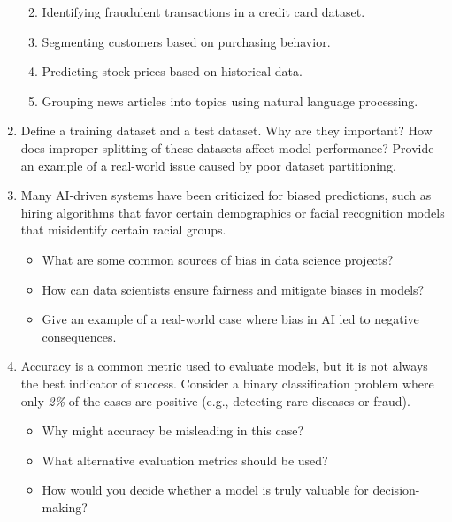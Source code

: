 \documentclass[
]{book}
\providecommand{\tightlist}{%
  \setlength{\itemsep}{0pt}\setlength{\parskip}{0pt}}
\theoremstyle{definition}
\theoremstyle{definition}
\theoremstyle{definition}
\theoremstyle{definition}
\theoremstyle{remark}
\begin{document}
\begin{enumerate}
  \begin{enumerate}
  \def\labelenumii{\alph{enumii}.}
  \tightlist
  \item
    Identifying fraudulent transactions in a credit card dataset.\\
  \item
    Segmenting customers based on purchasing behavior.\\
  \item
    Predicting stock prices based on historical data.\\
  \item
    Grouping news articles into topics using natural language processing.\\
  \end{enumerate}
\item
  Define a training dataset and a test dataset. Why are they important? How does improper splitting of these datasets affect model performance? Provide an example of a real-world issue caused by poor dataset partitioning.\\
\item
  Many AI-driven systems have been criticized for biased predictions, such as hiring algorithms that favor certain demographics or facial recognition models that misidentify certain racial groups.

  \begin{itemize}
  \tightlist
  \item
    What are some common sources of bias in data science projects?\\
  \item
    How can data scientists ensure fairness and mitigate biases in models?\\
  \item
    Give an example of a real-world case where bias in AI led to negative consequences.\\
  \end{itemize}
\item
  Accuracy is a common metric used to evaluate models, but it is not always the best indicator of success. Consider a binary classification problem where only \emph{2\%} of the cases are positive (e.g., detecting rare diseases or fraud).

  \begin{itemize}
  \tightlist
  \item
    Why might accuracy be misleading in this case?\\
  \item
    What alternative evaluation metrics should be used?\\
  \item
    How would you decide whether a model is truly valuable for decision-making?
  \end{itemize}
\end{enumerate}
\end{document}

